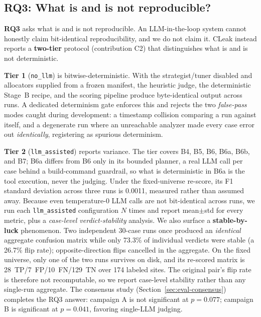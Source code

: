 \documentclass[a4paper]{llncs}
\begin{document}
\noindent{}

\subsection{RQ3: What is and is not reproducible?}
\label{sec:reproducibility}

\textbf{RQ3} asks what is and is not reproducible. An LLM-in-the-loop
system cannot honestly claim bit-identical reproducibility, and we do
not claim it. CLeak instead reports a
\textbf{two-tier} protocol (contribution C2) that distinguishes what is
and is not deterministic.

\textbf{Tier 1} (\texttt{no\_llm}) is bitwise-deterministic. With the
strategist/tuner disabled and allocators supplied from a frozen manifest,
the heuristic judge, the deterministic Stage~B recipe, and the scoring
pipeline produce byte-identical output across runs. A dedicated
determinism gate enforces this and rejects the two
\emph{false-pass} modes caught during development: a timestamp
collision comparing a run against itself, and a
degenerate run where an unreachable analyzer made every case error out
\emph{identically}, registering as spurious determinism.

\textbf{Tier 2} (\texttt{llm\_assisted}) reports variance. The tier
covers B4, B5, B6, B6a, B6b, and B7; B6a differs from B6 only in its
bounded planner, a real LLM call per case behind a build-command
guardrail, so what is deterministic in B6a is the tool execution, never
the judging. Under the fixed-universe re-score, its F1 standard deviation
across three runs is 0.0011, measured rather than assumed away. Because
even temperature-0 LLM calls are not bit-identical across runs, we
run each \texttt{llm\_assisted} configuration $N$ times and report
mean$\pm$std for every metric, plus a \emph{case-level
verdict-stability} analysis.
We also surface a
\textbf{stable-by-luck} phenomenon. Two independent
30-case runs once produced an \emph{identical} aggregate confusion
matrix while only 73.3\% of individual verdicts were stable (a 26.7\%
flip rate); opposite-direction flips cancelled in the aggregate.
On the fixed universe, only one of the two runs survives on disk, and
its re-scored matrix is 28~TP/7~FP/10~FN/129~TN over 174 labeled sites.
The original pair's flip rate is therefore not recomputable, so we
report case-level stability rather than any single-run aggregate. The
consensus study (Section~\ref{sec:eval-consensus}) completes the RQ3
answer: campaign A is not significant at
$p{=}0.077$; campaign B is significant at $p{=}0.041$, favoring
single-LLM judging.
\end{document}
